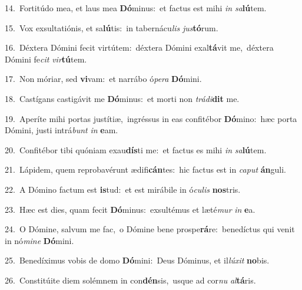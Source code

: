 {\numbfont\textcolor{\numbcolor}{14.}}~Fortitúdo mea, et laus mea \textbf{Dó}\-minus:~\star et factus est mihi \textit{in} \textit{sa}\-\textbf{lú}tem.\par
{\numbfont\textcolor{\numbcolor}{15.}}~Vox exsultatiónis, et sa\-\textbf{lú}\-tis:~\star in tabernácu\textit{lis} \textit{jus}\-\textbf{tó}rum.\par
{\numbfont\textcolor{\numbcolor}{16.}}~Déxtera Dómini fecit virtútem:~\dagger déxtera Dómini exal\-\textbf{tá}\-vit me,~\star déxtera Dómini fe\textit{cit} \textit{vir}\-\textbf{tú}tem.\par
{\numbfont\textcolor{\numbcolor}{17.}}~Non móriar, sed \textbf{vi}\-vam:~\star et narrábo ó\-\textit{pe}\-\textit{ra} \textbf{Dó}\-mini.\par
{\numbfont\textcolor{\numbcolor}{18.}}~Castígans castigávit me \textbf{Dó}\-minus:~\star et morti non \textit{trá}\-\textit{di}\textbf{dit} me.\par
{\numbfont\textcolor{\numbcolor}{19.}}~Aperíte mihi portas justítiæ,~\dagger ingréssus in eas confitébor \textbf{Dó}\-mino:~\star hæc porta Dómini, justi intrá\textit{bunt} \textit{in} \textbf{e}\-am.\par
{\numbfont\textcolor{\numbcolor}{20.}}~Confitébor tibi quóniam exau\-\textbf{dís}\-ti me:~\star et factus es mihi \textit{in} \textit{sa}\-\textbf{lú}tem.\par
{\numbfont\textcolor{\numbcolor}{21.}}~Lápidem, quem reprobavérunt ædifi\-\textbf{cán}\-tes:~\star hic factus est in \textit{ca}\-\textit{put} \textbf{án}\-guli.\par
{\numbfont\textcolor{\numbcolor}{22.}}~A Dómino factum est \textbf{is}\-tud:~\star et est mirábile in ó\-\textit{cu}\-\textit{lis} \textbf{nos}\-tris.\par
{\numbfont\textcolor{\numbcolor}{23.}}~Hæc est dies, quam fecit \textbf{Dó}\-minus:~\star exsultémus et læté\textit{mur} \textit{in} \textbf{e}\-a.\par
{\numbfont\textcolor{\numbcolor}{24.}}~O Dómine, salvum me fac,~\dagger o Dómine bene prospe\-\textbf{rá}\-re:~\star benedíctus qui venit in nó\-\textit{mi}\-\textit{ne} \textbf{Dó}\-mini.\par
{\numbfont\textcolor{\numbcolor}{25.}}~Benedíximus vobis de domo \textbf{Dó}\-mini:~\star Deus Dóminus, et il\-\textit{lú}\-\textit{xit} \textbf{no}\-bis.\par
{\numbfont\textcolor{\numbcolor}{26.}}~Constitúite diem solémnem in con\-\textbf{dén}\-sis,~\star usque ad cor\textit{nu} \textit{al}\-\textbf{tá}ris.\par
